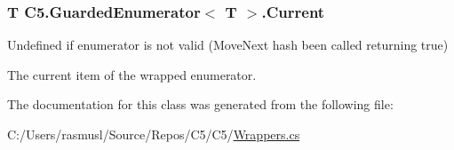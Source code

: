 \subsubsection[{Current}]{\setlength{\rightskip}{0pt plus 5cm}T {\bf C5.\+Guarded\+Enumerator}$<$ T $>$.Current\hspace{0.3cm}{\ttfamily [get]}}\label{class_c5_1_1_guarded_enumerator_af13904801a980feda3b2d6a4ec03db2c}


Undefined if enumerator is not valid (Move\+Next hash been called returning true) 

The current item of the wrapped enumerator.

The documentation for this class was generated from the following file\+:\begin{DoxyCompactItemize}
\item 
C\+:/\+Users/rasmusl/\+Source/\+Repos/\+C5/\+C5/\hyperlink{_wrappers_8cs}{Wrappers.\+cs}\end{DoxyCompactItemize}
